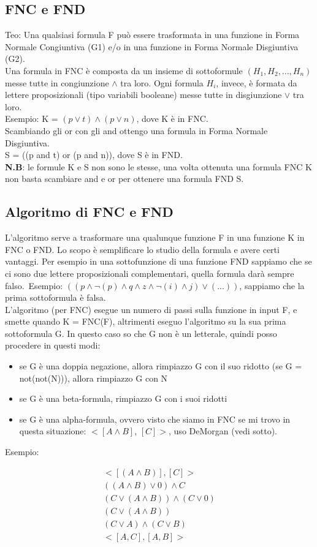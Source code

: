 \documentclass[11pt]{article}
\begin{document}
\subsection{FNC e FND}
Teo: Una qualsiasi formula F può essere trasformata in una funzione in Forma Normale Congiuntiva (G1) e/o in una funzione in Forma Normale Disgiuntiva (G2).\\
Una formula in FNC è composta da un insieme di sottoformule $(H_{1},H_{2},...,H_{n})$ messe tutte in congiunzione $\land$ tra loro. Ogni formula $H_{i}$, invece, è formata da lettere proposizionali (tipo variabili booleane) messe tutte in disgiunzione $\lor$ tra loro.\\
Esempio: K = $(p \lor t) \land (p \lor n)$, dove K è in FNC.\\
Scambiando gli or con gli and ottengo una formula in Forma Normale Disgiuntiva.\\
S = ((p and t) or (p and n)), dove S è in FND.\\
\textbf{N.B}: le formule K e S non sono le stesse, una volta ottenuta una formula FNC K non basta scambiare and e or per ottenere una formula FND S.
\subsection{Algoritmo di FNC e FND}
L'algoritmo serve a trasformare una qualunque funzione F in una funzione K in FNC o FND. Lo scopo è semplificare lo studio della formula e avere certi vantaggi. Per esempio in una sottofunzione di una funzione FND sappiamo che se ci sono due lettere proposizionali complementari, quella formula darà sempre falso.\
Esempio: $((p \land \neg(p) \land q \land z \land \neg(i) \land j) \lor (...))$, sappiamo che la prima sottoformula è falsa.\\

L'algoritmo (per FNC) esegue un numero di passi sulla funzione in input F, e smette quando K = FNC(F), altrimenti eseguo l'algoritmo su la sua prima sottoformula G. In questo caso so che G non è un letterale, quindi posso procedere in questi modi:
\begin{itemize}
    \item se G è una doppia negazione, allora rimpiazzo G con il suo ridotto (se G = not(not(N))), allora rimpiazzo G con N
    \item se G è una beta-formula, rimpiazzo G con i suoi ridotti
    \item se G è una alpha-formula, ovvero visto che siamo in FNC se mi trovo in questa situazione: $<[A \land B]$, $[C]>$, uso DeMorgan (vedi sotto).
\end{itemize}
Esempio:
\begin{center}
    \begin{align*}
        <[(A \land B)], [C]>\\
        ((A \land B) \lor 0) \land C\\
        (C \lor (A \land B)) \land (C \lor 0)\\
        (C \lor (A \land B))\\
        (C \lor A) \land (C \lor B)\\
        <[A,C],[A,B]>
    \end{align*}
\end{center}
\end{document}
